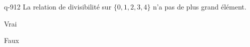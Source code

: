 \begin{truefalse}{q-912}
La relation de divisibilité sur $\{0,1,2,3,4\}$ n'a pas de plus grand élément.
\item Vrai
\item* Faux
\end{truefalse}

